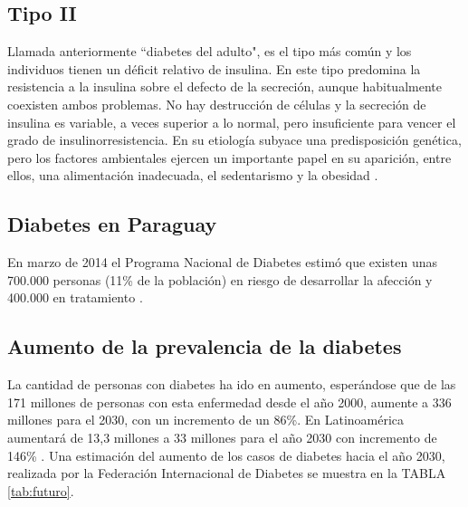 \subsection{Tipo II}
Llamada anteriormente ``diabetes del adulto", es el tipo más común y los individuos tienen un déficit relativo de insulina. En este tipo predomina la resistencia a la insulina sobre el defecto de la secreción,
aunque habitualmente coexisten ambos problemas. No hay destrucción de células y la secreción de insulina es variable, a veces superior a lo normal, pero insuficiente para vencer el grado de insulinorresistencia.
En su etiología subyace una predisposición genética, pero los factores ambientales ejercen un importante
papel en su aparición, entre ellos, una alimentación inadecuada, el sedentarismo y la obesidad \cite{mellitus2004diabetes}.

\subsection{Diabetes en Paraguay}
En marzo de 2014 el Programa Nacional de Diabetes estimó que existen unas 700.000 personas (11\% de la población) en riesgo de desarrollar la afección y 400.000 en tratamiento \cite{20medios}. 
\subsection{Aumento de la prevalencia de la diabetes}
La cantidad de personas con diabetes ha ido en aumento, esperándose que de las 171 millones de personas con esta enfermedad desde el año 2000, aumente a 336 millones para el 2030, con un incremento de un 86\%. En Latinoamérica aumentará de 13,3 millones a 33 millones para el año 2030 con incremento de 146\% \cite{wild2004global}. Una estimación del aumento de los casos de diabetes hacia el año 2030, realizada por la Federación Internacional de Diabetes \cite{idf} se muestra en la TABLA \ref{tab:futuro}.


